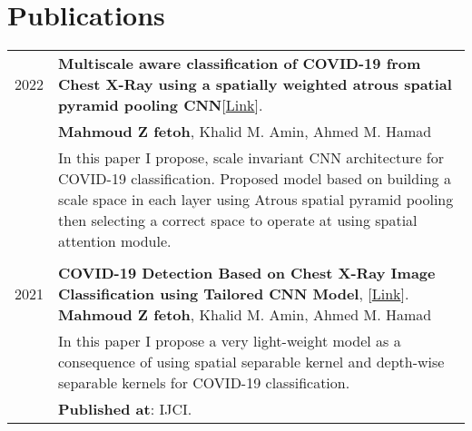 \documentclass[a4paper,10pt]{article}
\begin{document}
\section{\textbf{Publications}}  
    \begin{longtable}{r p{16cm}}
        2022  & \textbf{Multiscale aware classification of COVID-19 from Chest X-Ray using a spatially weighted atrous spatial pyramid pooling CNN}[\href{https://www.researchsquare.com/article/rs-3043485/v1}{Link}].\\& \textbf{Mahmoud Z fetoh}, Khalid M. Amin, Ahmed M. Hamad \\&
        In this paper I propose, scale invariant CNN architecture for COVID-19 classification. Proposed model based on building a scale space in each layer using Atrous spatial pyramid pooling then selecting a correct space to operate at using spatial attention module.\\
        &\\ 
        2021  & \textbf{COVID-19 Detection Based on Chest X-Ray Image Classification using Tailored CNN Model}, [\href{https://scholar.google.com/scholar?cluster=12675761567539204826&hl=en&as_sdt=0,5}{Link}].
        \textbf{Mahmoud Z fetoh}, Khalid M. Amin, Ahmed M. Hamad \\&
        In this paper I propose a very light-weight model as a consequence of using spatial separable kernel and depth-wise separable kernels for COVID-19 classification.\\&
        \textbf{Published at}: IJCI.  
        \\
    \end{longtable}
\end{document}

